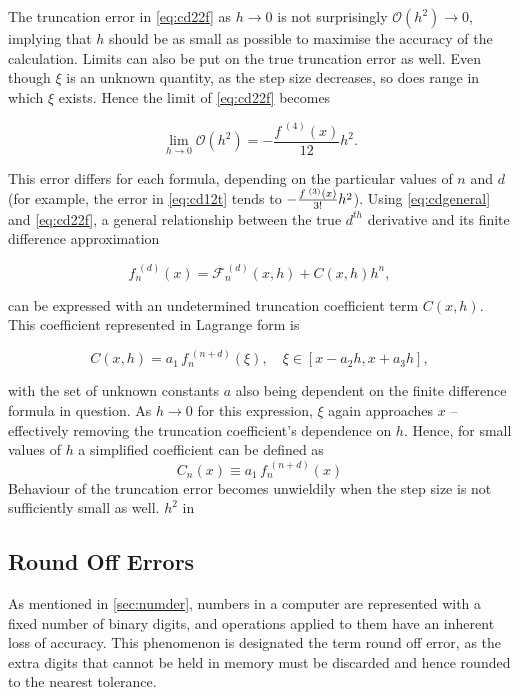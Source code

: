 The truncation error in \cref{eq:cd22f} as $h\!\to\!0$ is not surprisingly $\mathcal{O}(h^2)\!\to\!0$, implying that $h$ should be as small as possible to maximise the accuracy of the calculation.
Limits can also be put on the true truncation error as well. 
Even though $\xi$ is an unknown quantity, as the step size decreases, so does range in which $\xi$ exists.
Hence the limit of \cref{eq:cd22f} becomes

\begin{equation}
\lim_{h \to 0}\mathcal{O}(h^2) =  - \frac{f^{\;(4)}(x)}{12}h^2.
\end{equation}

This error differs for each formula, depending on the particular values of $n$ and $d$ (for example, the error in \cref{eq:cd12t} tends to $\cramped{-\frac{f^{\;(3)}(x)}{3!}h^2}$).
Using \cref{eq:cdgeneral} and \cref{eq:cd22f}, a general relationship between the true $d^{th}$ derivative and its finite difference approximation

\begin{equation}
 f_n^{\;(d)}(x) = \mathcal{F}_n^{\,(d)}(x,h) + C(x,h)h^n,
\end{equation}

can be expressed with an undetermined truncation coefficient term $C(x,h)$. 
This coefficient represented in Lagrange form is

\begin{equation}
C(x,h) = a_1\,f_n^{\;(n+d)}(\xi), \quad \xi \in [x-a_2h,x+a_3h],
\end{equation}

with the set of unknown constants $a$ also being dependent on the finite difference formula in question. 
As $h \to 0$ for this expression, $\xi$ again approaches $x$ -- effectively removing the truncation coefficient's dependence on $h$.
Hence, for small values of $h$ a simplified coefficient can be defined as
\begin{equation}
 C_n(x) \equiv a_1\,f_n^{\;(n+d)}(x)
\end{equation}
Behaviour of the truncation error becomes unwieldily when the step size is not sufficiently small as well. $h^2$ in  

\subsection{Round Off Errors}

As mentioned in \cref{sec:numder}, numbers in a computer are represented with a fixed number of binary digits, and operations applied to them have an inherent loss of accuracy.
This phenomenon is designated the term round off error, as the extra digits that cannot be held in memory must be discarded and hence rounded to the nearest tolerance.


